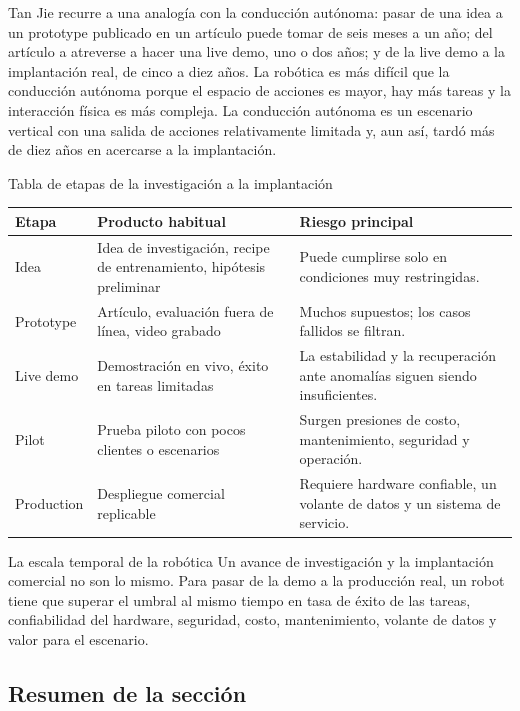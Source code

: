 \documentclass[a4paper]{article}
\begin{document}
Tan Jie recurre a una analogía con la conducción autónoma: pasar de una idea a un prototype publicado en un artículo puede tomar de seis meses a un año; del artículo a atreverse a hacer una live demo, uno o dos años; y de la live demo a la implantación real, de cinco a diez años. La robótica es más difícil que la conducción autónoma porque el espacio de acciones es mayor, hay más tareas y la interacción física es más compleja. La conducción autónoma es un escenario vertical con una salida de acciones relativamente limitada y, aun así, tardó más de diez años en acercarse a la implantación.

\begin{knowledgebox}{Tabla de etapas de la investigación a la implantación}
\begin{tabularx}{\textwidth}{p{}p{}X}
\toprule
Etapa & Producto habitual & Riesgo principal \\
\midrule
Idea & Idea de investigación, recipe de entrenamiento, hipótesis preliminar & Puede cumplirse solo en condiciones muy restringidas. \\
Prototype & Artículo, evaluación fuera de línea, video grabado & Muchos supuestos; los casos fallidos se filtran. \\
Live demo & Demostración en vivo, éxito en tareas limitadas & La estabilidad y la recuperación ante anomalías siguen siendo insuficientes. \\
Pilot & Prueba piloto con pocos clientes o escenarios & Surgen presiones de costo, mantenimiento, seguridad y operación. \\
Production & Despliegue comercial replicable & Requiere hardware confiable, un volante de datos y un sistema de servicio. \\
\bottomrule
\end{tabularx}
\end{knowledgebox}

\begin{importantbox}{La escala temporal de la robótica}
Un avance de investigación y la implantación comercial no son lo mismo. Para pasar de la demo a la producción real, un robot tiene que superar el umbral al mismo tiempo en tasa de éxito de las tareas, confiabilidad del hardware, seguridad, costo, mantenimiento, volante de datos y valor para el escenario.
\end{importantbox}

\subsection{Resumen de la sección}
\end{document}
